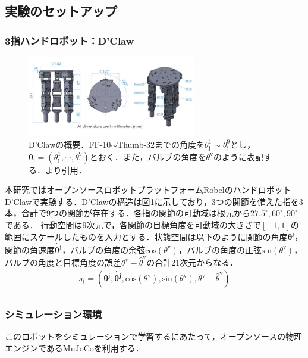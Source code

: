 \documentclass[dvipdfmx]{ampbt_nomag}
\begin{document}
\subsection{実験のセットアップ}
\subsubsection{3指ハンドロボット：D'Claw}
\begin{figure}[hbtp]
  \centering
  \includegraphics[height=3.5cm]
       {asset/img/dclaw.pdf}
  \caption{D'Clawの概要．FF-10$\sim$Thumb-32までの角度を$\theta^1_{\textrm{j}}\sim\theta^9_{\textrm{j}}$とし，$\boldsymbol{\theta}_{\textrm{j}}=(\theta^1_{\textrm{j}},\cdots,\theta^9_{\textrm{j}})$とおく．また，バルブの角度を$\theta^{\textrm{v}}$のように表記する．\cite{ahn2020robel}より引用．}
  \label{dclaw_structure}
\end{figure}
 
本研究ではオープンソースロボットプラットフォームRobelのハンドロボットD'Clawで実験する\cite{ahn2020robel}．D'Clawの構造は図\ref{dclaw_structure}に示しており，3つの関節を備えた指を3本，合計で9つの関節が存在する．各指の関節の可動域は根元から$27.5^\circ,60^\circ,90^\circ$である．
行動空間は9次元で，各関節の目標角度を可動域の大きさで$[-1,1]$の範囲にスケールしたものを入力とする．状態空間は以下のように関節の角度$\boldsymbol{\theta}^{\textrm{j}}$，関節の角速度$\dot{\boldsymbol{\theta^{\textrm{j}}}}$，バルブの角度の余弦$\textrm{cos}(\theta^{\textrm{v}})$，バルブの角度の正弦$\textrm{sin}(\theta^{\textrm{v}})$，バルブの角度と目標角度の誤差$\theta^{\textrm{v}} - \hat{\theta}^{\textrm{v}}$の合計21次元からなる．
\begin{eqnarray}\label{state}
  s_t = \left(\boldsymbol{\theta}^{\textrm{j}},\dot{\boldsymbol{\theta^{\textrm{j}}}},\textrm{cos}(\theta^{\textrm{v}}),\textrm{sin}(\theta^{\textrm{v}}),\theta^{\textrm{v}} - \hat{\theta}^{\textrm{v}}\right) \nonumber \\ 
\end{eqnarray}

\subsubsection{シミュレーション環境}
このロボットをシミュレーションで学習するにあたって，オープンソースの物理エンジンであるMuJoCoを利用する\cite{Mujoco}．
\end{document}
